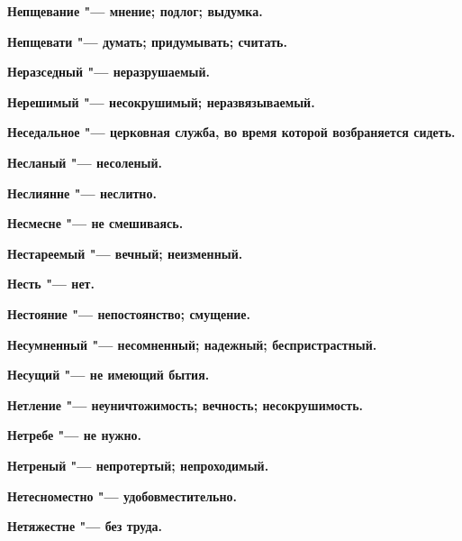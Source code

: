 \begin{mymulticols}{2}
\bfseries Непщевание\normalfont{} "--- мнение; подлог; выдумка. 




\bfseries Непщевати\normalfont{} "--- думать; придумывать; считать. 




\bfseries Неразседный\normalfont{} "--- неразрушаемый. 




\bfseries Нерешимый\normalfont{} "--- несокрушимый; неразвязываемый. 




\bfseries Неседальное\normalfont{} "--- церковная служба, во время которой возбраняется сидеть. 




\bfseries Несланый\normalfont{} "--- несоленый. 




\bfseries Неслиянне\normalfont{} "--- неслитно. 




\bfseries Несмесне\normalfont{} "--- не смешиваясь. 




\bfseries Нестареемый\normalfont{} "--- вечный; неизменный. 




\bfseries Несть\normalfont{} "--- нет. 




\bfseries Нестояние\normalfont{} "--- непостоянство; смущение. 




\bfseries Несумненный\normalfont{} "--- несомненный; надежный; беспристрастный. 




\bfseries Несущий\normalfont{} "--- не имеющий бытия. 




\bfseries Нетление\normalfont{} "--- неуничтожимость; вечность; несокрушимость. 




\bfseries Нетребе\normalfont{} "--- не нужно. 




\bfseries Нетреный\normalfont{} "--- непротертый; непроходимый. 




\bfseries Нетесноместно\normalfont{} "--- удобовместительно. 




\bfseries Нетяжестне\normalfont{} "--- без труда. 





\end{mymulticols}

